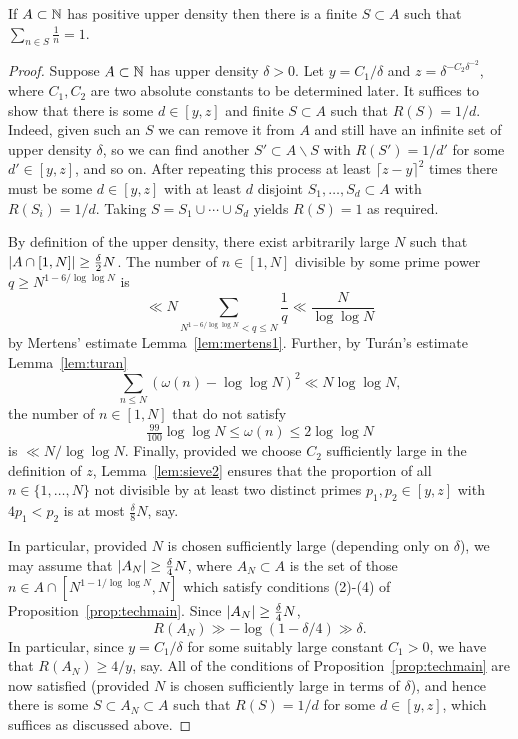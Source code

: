 \begin{theorem}\label{th:density_theorem}
\leanok
{}
If $A\subset \mathbb{N}$ has positive upper density then there is a finite $S\subset A$ such that $\sum_{n\in S}\frac{1}{n}=1$.
\end{theorem}
\begin{proof}
  \leanok
  Suppose $A\subset \mathbb{N}$ has upper density $\delta>0$. Let $y=C_1/\delta$ and $z=\delta^{-C_2\delta^{-2}}$, where $C_1,C_2$ are two absolute constants to be determined later. It suffices to show that there is some $d\in [y,z]$ and finite $S\subset A$ such that $R(S)=1/d$. Indeed, given such an $S$ we can remove it from $A$ and still have an infinite set of upper density $\delta$, so we can find another $S'\subset A\backslash S$ with $R(S')=1/d'$ for some $d'\in [y,z]$, and so on. After repeating this process at least $\lceil z-y\rceil^2$ times there must be some $d\in [y,z]$ with at least $d$ disjoint $S_1,\ldots,S_d\subset A$ with $R(S_i)=1/d$. Taking $S=S_1\cup\cdots \cup S_d$ yields $R(S)=1$ as required.

  By definition of the upper density, there exist arbitrarily large $N$ such that $\left\lvert A\cap [1,N]\right\rvert\geq \frac{\delta}{2}N$. The number of $n\in [1,N]$ divisible by some prime power $q\geq N^{1-6/\log\log N}$ is
  \[\ll N \sum_{N^{1-6/\log\log N}<q\leq N}\frac{1}{q}\ll \frac{N}{\log\log N}\]
  by Mertens' estimate Lemma~\ref{lem:mertens1}. Further, by Tur\'{a}n's estimate Lemma~\ref{lem:turan}
  \[\sum_{n\leq N}(\omega(n)-\log\log N)^2 \ll N \log\log N,\]
  the number of $n\in [1,N]$ that do not satisfy
  \begin{equation}\label{divs}
  \tfrac{99}{100}\log\log N\leq \omega(n) \leq 2\log\log N
  \end{equation}
  is $\ll N/\log\log N$. Finally, provided we choose $C_2$ sufficiently large in the definition of $z$, Lemma~\ref{lem:sieve2} ensures that the proportion of all $n\in \{1,\ldots,N\}$ not divisible by at least two distinct primes $p_1,p_2\in [y,z]$ with $4p_1<p_2$ is at most $\frac{\delta}{8}N$, say.

  In particular, provided $N$ is chosen sufficiently large (depending only on $\delta$), we may assume that $\left\lvert A_N\right\rvert\geq \frac{\delta}{4}N$, where $A_N\subset A$ is the set of those $n\in A\cap [N^{1-1/\log\log N},N]$ which satisfy conditions (2)-(4) of Proposition~\ref{prop:techmain}. Since $\left\lvert A_N\right\rvert\geq \frac{\delta}{4}N$,
  \[R(A_N) \gg -\log(1-\delta/4)\gg \delta.\]
  In particular, since $y=C_1/\delta$ for some suitably large constant $C_1>0$, we have that $R(A_N)\geq 4/y$, say. All of the conditions of Proposition~\ref{prop:techmain} are now satisfied (provided $N$ is chosen sufficiently large in terms of $\delta$), and hence there is some $S\subset A_N\subset A$ such that $R(S)=1/d$ for some $d\in [y,z]$, which suffices as discussed above.
\end{proof}

